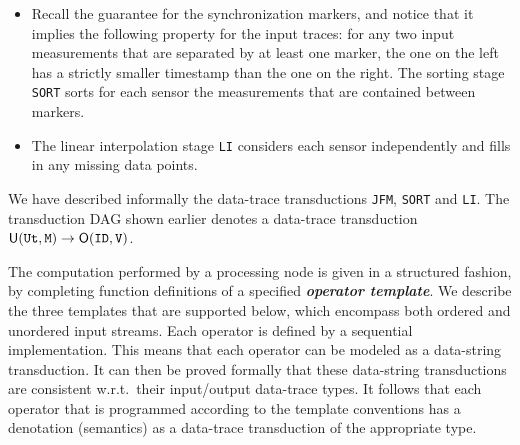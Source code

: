 \begin{example}
\begin{itemize}
\item
Recall the guarantee for the synchronization markers, and notice that it implies the following property for the input traces: for any two input measurements that are separated by at least one marker, the one on the left has a strictly smaller timestamp than the one on the right. The sorting stage \texttt{SORT} sorts for each sensor the measurements that are contained between markers.
\item
The linear interpolation stage \texttt{LI} considers each sensor independently and fills in any missing data points.
\end{itemize}
We have described informally the data-trace transductions \texttt{JFM}, \texttt{SORT} and \texttt{LI}. The transduction DAG shown earlier denotes a data-trace transduction $\mathsf{U}(\mathtt{Ut},\texttt{M}) \to \mathsf{O}(\texttt{ID},\texttt{V})$.
\end{example}

The computation performed by a processing node is given in a structured fashion, by completing function definitions of a specified \textbf{\em operator template}. We describe the three templates that are supported below, which encompass both ordered and unordered input streams. Each operator is defined by a sequential implementation. This means that each operator can be modeled as a data-string transduction. It can then be proved formally that these data-string transductions are consistent w.r.t.\ their input/output data-trace types. It follows that each operator that is programmed according to the template conventions has a denotation (semantics) as a data-trace transduction of the appropriate type.

